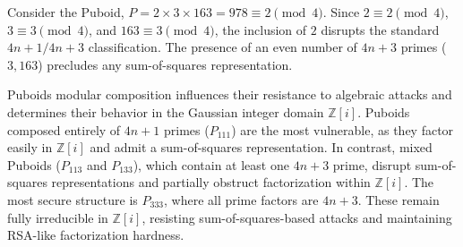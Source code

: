 

Consider the Puboid, \( P = 2 \times 3 \times 163 = 978 \equiv 2 \pmod{4}.\) Since $ 2 \equiv 2 \pmod{4} $, $ 3 \equiv 3 \pmod{4} $, and $ 163 \equiv 3 \pmod{4} $, the inclusion of $ 2 $ disrupts the standard $ 4n+1 / 4n+3 $ classification. The presence of an even number of $ 4n+3 $ primes ($ 3, 163 $) precludes any sum-of-squares representation.

\bigskip

Puboids modular composition influences their resistance to algebraic attacks and determines their behavior in the Gaussian integer domain $ \mathbb{Z}[i] $. Puboids composed entirely of $ 4n+1 $ primes ($ P_{111} $) are the most vulnerable, as they factor easily in $ \mathbb{Z}[i] $ and admit a sum-of-squares representation. In contrast, mixed Puboids ($ P_{113} $ and $ P_{133} $), which contain at least one $ 4n+3 $ prime, disrupt sum-of-squares representations and partially obstruct factorization within $ \mathbb{Z}[i] $. The most secure structure is $ P_{333} $, where all prime factors are $ 4n+3 $. These remain fully irreducible in $ \mathbb{Z}[i] $, resisting sum-of-squares-based attacks and maintaining RSA-like factorization hardness.

